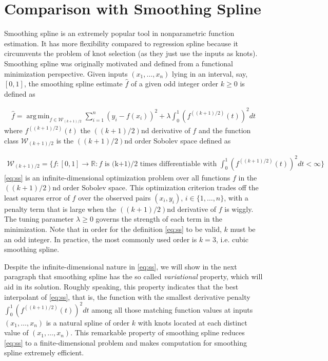 \documentclass[a4paper]{article}
\DeclareMathOperator*{\argmin}{arg\,min}
\newcommand{\RR}{\mathbb{R}}
\renewcommand{\cal}{\mathcal}
\begin{document}
\section{Comparison with Smoothing Spline}
\label{sec:comp_ss}
Smoothing spline is an extremely popular tool in nonparametric function estimation. It has more flexibility compared to regression spline because it circumvents the problem of knot selection (as they just use the inputs as knots). Smoothing spline was originally motivated and defined from a functional minimization perspective. Given inputs $(x_1,\ldots, x_n)$ lying in an interval, say, $[0, 1]$, the smoothing spline estimate $\hat{f}$ of a given odd integer order $k\geq 0$ is defined as

\begin{align}
\hat{f} = \argmin_{f\in\cal{W}_{(k+1)/2}}\sum_{i=1}^n (y_i - f(x_i))^2 + \lambda \int_0^1 (f^{((k+1)/2)}(t))^2dt
\label{eq:ss}
\end{align}
where $f^{((k+1)/2)}(t)$ the $((k+1)/2)$nd derivative of $f$ and the function class $\cal{W}_{(k+1)/2}$ is the $((k+1)/2)$nd order Sobolev space defined as

\begin{align*}
\cal{W}_{(k+1)/2} = \big\{f:[0,1]\rightarrow \RR:f\text{ is (k+1)/2 times differentiable with } \int_0^1(f^{((k+1)/2)}(t))^2dt<\infty\big\}
\end{align*}
\eqref{eq:ss} is an infinite-dimensional optimization problem over all functions $f$ in the $((k+1)/2)$nd order Sobolev space. This optimization criterion trades off the least squares error of $f$ over the observed pairs $(x_i, y_i)$, $i\in\{1,\ldots, n\}$, with a penalty term that is large when the $((k+1)/2)$nd derivative of $f$ is wiggly. The tuning parameter $\lambda \geq 0$ governs the strength of each term in the minimization. Note that in order for the definition \eqref{eq:ss} to be valid, $k$ must be an odd integer. In practice, the most commonly used order is $k = 3$, i.e. cubic smoothing spline. 

Despite the infinite-dimensional nature in \eqref{eq:ss}, we will show in the next paragraph that smoothing spline has the so called \textit{variational} property, which will aid in its solution. Roughly speaking, this property indicates that the best interpolant of \eqref{eq:ss}, that is, the function with the smallest derivative penalty $\int_0^1(f^{((k+1)/2)}(t))^2dt$ among all those matching function values at inputs $(x_1,\ldots, x_n)$ is a natural spline of order $k$ with knots located at each distinct value of $(x_1,\ldots, x_n)$. This remarkable property of smoothing spline reduces \eqref{eq:ss} to a finite-dimensional problem and makes computation for smoothing spline extremely efficient.
\end{document}
